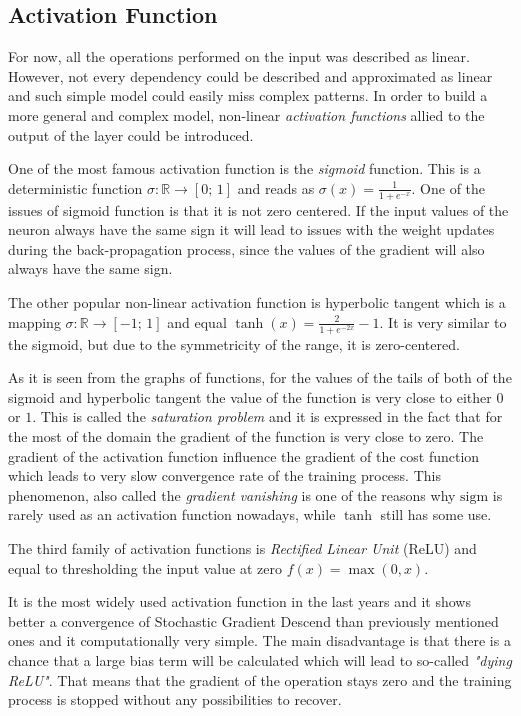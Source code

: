 


\subsection{Activation Function}

For now, all the operations performed on the input was described as linear.
However, not every dependency could be described and approximated as linear and such simple model could easily miss complex patterns.
In order to build a more general and complex model, non-linear \textit{activation functions} allied to the output of the layer could be introduced.

One of the most famous activation function is the \textit{sigmoid} function.
This is a deterministic function $ \sigma : \mathbb{R} \rightarrow [0; \, 1] $ and reads as $ \sigma(x) = \frac{1}{1+e^{-x}} $.
One of the issues of sigmoid function is that it is not zero centered.
If the input values of the neuron always have the same sign it will lead to issues with the weight updates during the back-propagation process, since the values of the gradient will also always have the same sign.

The other popular non-linear activation function is hyperbolic tangent which is a mapping $ \sigma : \mathbb{R} \rightarrow [-1; \, 1]$ and equal $\tanh(x)=\frac{2}{1+e^{-2x}}-1$.
It is very similar to the sigmoid, but due to the symmetricity of the range, it is zero-centered.

As it is seen from the graphs of functions, for the values of the tails of both of the sigmoid and hyperbolic tangent the value of the function is very close to either $0$ or $1$.
This is called the \textit{saturation problem} and it is expressed in the fact that for the most of the domain the gradient of the function is very close to zero.
The gradient of the activation function influence the gradient of the cost function which leads to very slow convergence rate of the training process.
This phenomenon, also called the \textit{gradient vanishing} is one of the reasons why $\mathrm{sigm}$ is rarely used as an activation function nowadays, while $\tanh$ still has some use.

The third family of activation functions is \textit{Rectified Linear Unit} (ReLU) and equal to thresholding the input value at zero $f(x)=\max(0,x)$. 

It is the most widely used activation function in the last years and it shows better a convergence of Stochastic Gradient Descend than previously mentioned ones and it computationally very simple.
The main disadvantage is that there is a chance that a large bias term will be calculated which will lead to so-called \textit{"dying ReLU"}. 
That means that the gradient of the operation stays zero and the training process is stopped without any possibilities to recover. 

